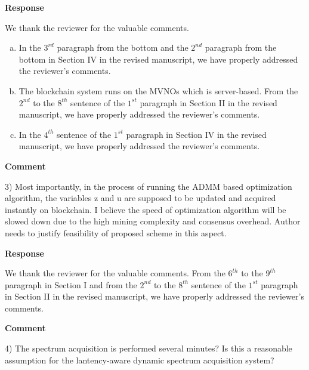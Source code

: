\documentclass[12pt,draftcls, onecolumn]{IEEEtran}
\begin{document}
\vspace{3mm} \noindent\textcolor[rgb]{0.00,0.00,1.00}{\textbf{Response}}
\vspace{2mm}

We thank the reviewer for the valuable comments. 
 \begin{enumerate}[(a)]
	\item In the $ 3^{rd} $ paragraph from the bottom and the $ 2^{nd} $ paragraph from the bottom in Section IV in the revised manuscript, we have properly addressed the reviewer's comments.
	
	\item The blockchain system runs on the MVNOs which is server-based. From the $ 2^{nd} $ to the $ 8^{th} $ sentence of the $ 1^{st} $ paragraph in Section II in the revised manuscript, we have properly addressed the reviewer's comments.
	
	\item  In the $ 4^{th} $ sentence of the $ 1^{st} $ paragraph in Section IV in the revised manuscript, we have properly addressed the reviewer's comments.
\end{enumerate}

\vspace{3mm}
\noindent\textcolor[rgb]{1.00,0.00,0.00}{\textbf{Comment}}
\vspace{3mm}


3) Most importantly, in the process of running the ADMM based optimization algorithm, the variables z and u are supposed to be updated and acquired instantly on blockchain. I believe the speed of optimization algorithm will be slowed down due to the high mining complexity and consensus overhead. Author needs to justify feasibility of proposed scheme in this aspect.  

\vspace{3mm} \noindent\textcolor[rgb]{0.00,0.00,1.00}{\textbf{Response}}
\vspace{2mm}

We thank the reviewer for the valuable comments. From the $ 6^{th} $ to the $ 9^{th} $ paragraph in Section I and from the $ 2^{nd} $ to the $ 8^{th} $ sentence of the $ 1^{st} $ paragraph in Section II in the revised manuscript, we have properly addressed the reviewer's comments.

\vspace{3mm}
\noindent\textcolor[rgb]{1.00,0.00,0.00}{\textbf{Comment}}
\vspace{3mm}

4) The spectrum acquisition is performed several minutes? Is this a reasonable assumption for the lantency-aware dynamic spectrum acquisition system?
\end{document}
